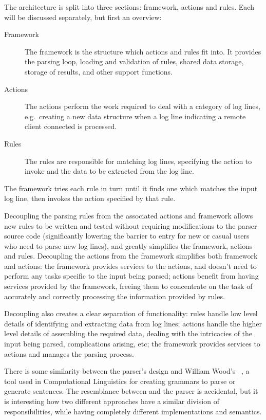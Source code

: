 \documentclass[draft]{svmult}
\begin{document}
The architecture is split into three sections: framework, actions and
rules.  Each will be discussed separately, but first an overview:

\begin{description}

    \item [Framework]  The framework is the structure which actions and
        rules fit into.  It provides the parsing loop, loading and
        validation of rules, shared data storage, storage of results, and
        other support functions.

    \item [Actions]  The actions perform the work required to deal with a
        category of log lines, e.g.\ creating a new data structure when a
        log line indicating a remote client connected is processed.

    \item [Rules]  The rules are responsible for matching log lines,
        specifying the action to invoke and the data to be extracted from
        the log line.

\end{description}

The framework tries each rule in turn until it finds one which matches the
input log line, then invokes the action specified by that rule.

Decoupling the parsing rules from the associated actions and framework
allows new rules to be written and tested without requiring modifications
to the parser source code (significantly lowering the barrier to entry for
new or casual users who need to parse new log lines), and greatly
simplifies the framework, actions and rules. Decoupling the actions from
the framework simplifies both framework and actions: the framework provides
services to the actions, and doesn't need to perform any tasks specific to
the input being parsed; actions benefit from having services provided by
the framework, freeing them to concentrate on the task of accurately and
correctly processing the information provided by rules.

Decoupling also creates a clear separation of functionality: rules handle
low level details of identifying and extracting data from log lines;
actions handle the higher level details of assembling the required data,
dealing with the intricacies of the input being parsed, complications
arising, etc; the framework provides services to actions and manages the
parsing process.

There is some similarity between the parser's design and William Wood's
\ATN{}~\cite{atns, nlpip}, a tool used in Computational Linguistics for
creating grammars to parse or generate sentences.  The resemblance between
\ATN{} and the parser is accidental, but it is interesting how two
different approaches have a similar division of responsibilities, while
having completely different implementations and semantics.
\end{document}
